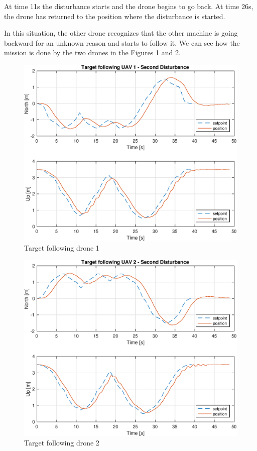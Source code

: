 At time 11s the disturbance starts and the drone begins to go back. At time 26s,
the drone has returned to the position where the disturbance is started.

In this situation, the other drone recognizes that the other machine is going backward
for an unknown reason and starts to follow it. We can see how the mission is done
by the two drones in the Figures \ref{fig:following_1_2} and \ref{fig:following_2_2}.

\begin{figure}
\centering
\includegraphics[width=0.7\linewidth]{chapters/chapter-04/figures/following_1_2.eps}
\caption{Target following drone 1}
\label{fig:following_1_2}
\end{figure}

\begin{figure}
\centering
\includegraphics[width=0.7\linewidth]{chapters/chapter-04/figures/following_2_2.eps}
\caption{Target following drone 2}
\label{fig:following_2_2}
\end{figure}

